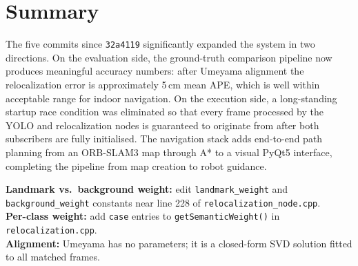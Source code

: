 \documentclass[11pt,a4paper]{article}
\begin{document}
\section{Summary}

The five commits since \texttt{32a4119} significantly expanded the system in
two directions. On the evaluation side, the ground-truth comparison pipeline
now produces meaningful accuracy numbers: after Umeyama alignment the
relocalization error is approximately 5\,cm mean APE, which is well within
acceptable range for indoor navigation. On the execution side, a long-standing
startup race condition was eliminated so that every frame processed by the
YOLO and relocalization nodes is guaranteed to originate from after both
subscribers are fully initialised. The navigation stack adds end-to-end path
planning from an ORB-SLAM3 map through A* to a visual PyQt5 interface,
completing the pipeline from map creation to robot guidance.

\vspace{1em}
\begin{tcolorbox}[colback=green!6, colframe=green!60!black,
  fonttitle=\bfseries, title={Tuning Reference}]
\textbf{Landmark vs.\ background weight:} edit \texttt{landmark\_weight} and
\texttt{background\_weight} constants near line 228 of
\texttt{relocalization\_node.cpp}.\\[4pt]
\textbf{Per-class weight:} add \texttt{case} entries to
\texttt{getSemanticWeight()} in \texttt{relocalization.cpp}.\\[4pt]
\textbf{Alignment:} Umeyama has no parameters; it is a closed-form SVD
solution fitted to all matched frames.
\end{tcolorbox}
\end{document}
